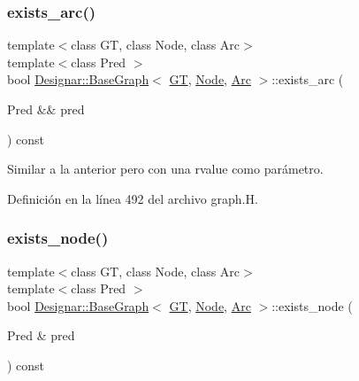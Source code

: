 \subsubsection{\texorpdfstring{exists\+\_\+arc()}{exists\_arc()}\hspace{0.1cm}{\footnotesize\ttfamily [2/2]}}
{\footnotesize\ttfamily template$<$class GT, class Node, class Arc$>$ \\
template$<$class Pred $>$ \\
bool \hyperlink{class_designar_1_1_base_graph}{Designar\+::\+Base\+Graph}$<$ \hyperlink{demo-buildgraph_8_c_a3001c40d2c31ca87ed96cd7d1334a55e}{GT}, \hyperlink{namespace_designar_a5af326c65aa2bd26b26c410f2030d09e}{Node}, \hyperlink{namespace_designar_a3f55fb5513d62ff47cbc8f72b8e95d6f}{Arc} $>$\+::exists\+\_\+arc (\begin{DoxyParamCaption}\item[{Pred \&\&}]{pred }\end{DoxyParamCaption}) const\hspace{0.3cm}{\ttfamily [inline]}}



Similar a la anterior pero con una rvalue como parámetro. 



Definición en la línea 492 del archivo graph.\+H.

\mbox{\label{class_designar_1_1_base_graph_a3631470de61b819211c72fdd2ac31b34}} 
\subsubsection{\texorpdfstring{exists\+\_\+node()}{exists\_node()}\hspace{0.1cm}{\footnotesize\ttfamily [1/2]}}
{\footnotesize\ttfamily template$<$class GT, class Node, class Arc$>$ \\
template$<$class Pred $>$ \\
bool \hyperlink{class_designar_1_1_base_graph}{Designar\+::\+Base\+Graph}$<$ \hyperlink{demo-buildgraph_8_c_a3001c40d2c31ca87ed96cd7d1334a55e}{GT}, \hyperlink{namespace_designar_a5af326c65aa2bd26b26c410f2030d09e}{Node}, \hyperlink{namespace_designar_a3f55fb5513d62ff47cbc8f72b8e95d6f}{Arc} $>$\+::exists\+\_\+node (\begin{DoxyParamCaption}\item[{Pred \&}]{pred }\end{DoxyParamCaption}) const\hspace{0.3cm}{\ttfamily [inline]}}



